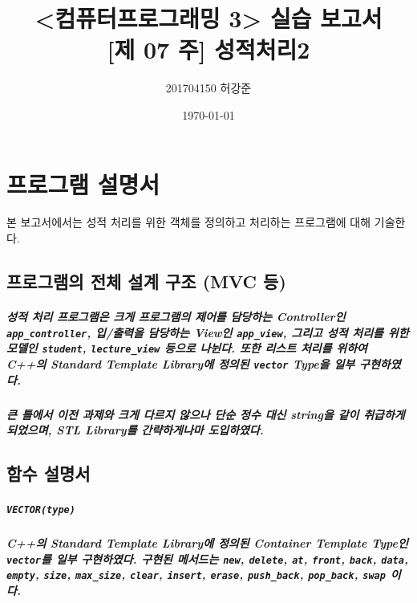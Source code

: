 \documentclass[UTF8]{report}
\title{%
    <컴퓨터프로그래밍 3> 실습 보고서 \\ 
    \large [제 07 주] 성적처리2}
\author{201704150 허강준}
\date{\today}
\begin{document}
    \maketitle
    \tableofcontents

    \chapter{프로그램 설명서}
        본 보고서에서는 성적 처리를 위한 객체를 정의하고 처리하는 프로그램에 대해 기술한다.

        \section{프로그램의 전체 설계 구조 (MVC 등)}
            
            \paragraph{%
                \normalfont 성적 처리 프로그램은 크게 프로그램의 제어를 담당하는 Controller인 \texttt{app\_controller}, 입/출력을 담당하는 View인 \texttt{app\_view}, 그리고 성적 처리를 위한 모델인 \texttt{student}, \texttt{lecture\_view} 등으로 나뉜다. 또한 리스트 처리를 위하여 C++의 Standard Template Library에 정의된 \texttt{vector} Type을 일부 구현하였다.
            }

            \paragraph{%
                \normalfont 큰 틀에서 이전 과제와 크게 다르지 않으나 단순 정수 대신 string을 같이 취급하게 되었으며, STL Library를 간략하게나마 도입하였다.
            }
            
        \section{함수 설명서}
            
            \paragraph{\texttt{VECTOR(type)}}
            \paragraph{%
                \normalfont C++의 Standard Template Library에 정의된 Container Template Type인 \texttt{vector}를 일부 구현하였다. 구현된 메서드는 \texttt{new},  \texttt{delete}, \texttt{at}, \texttt{front}, \texttt{back}, \texttt{data}, \texttt{empty}, \texttt{size}, \texttt{max\_size}, \texttt{clear}, \texttt{insert}, \texttt{erase}, \texttt{push\_back}, \texttt{pop\_back}, \texttt{swap} 이다.
            }
\end{document}
